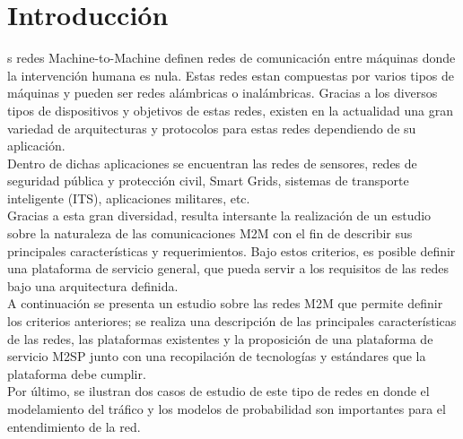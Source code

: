 \documentclass[journal]{IEEEtran}
\begin{document}
\section{Introducci\'on}
% 
% 
% 
% 
s redes Machine-to-Machine definen redes de comunicación entre máquinas donde la intervención humana es nula. Estas redes estan compuestas por varios tipos de máquinas y pueden ser redes alámbricas o inalámbricas. Gracias a los diversos tipos de dispositivos y objetivos de estas redes, existen en la actualidad una gran variedad de arquitecturas y protocolos para estas redes dependiendo de su aplicación.\\

Dentro de dichas aplicaciones se encuentran las redes de sensores, redes de seguridad pública y protección civil, Smart Grids, sistemas de transporte inteligente (ITS), aplicaciones militares, etc.\\

Gracias a esta gran diversidad, resulta intersante la realización de un estudio sobre la naturaleza de las comunicaciones M2M con el fin de describir sus principales características y requerimientos. Bajo estos criterios, es posible definir una plataforma de servicio general, que pueda servir a los requisitos de las redes bajo una arquitectura definida.\\

A continuación se presenta un estudio sobre las redes M2M que permite definir los criterios anteriores; se realiza una descripción de las principales características de las redes, las plataformas existentes y la proposición de una plataforma de servicio M2SP junto con una recopilación de tecnologías y estándares que la plataforma debe cumplir.\\

Por último, se ilustran dos casos de estudio de este tipo de redes en donde el modelamiento del tráfico y los modelos de probabilidad son importantes para el entendimiento de la red.
 
\end{document}

